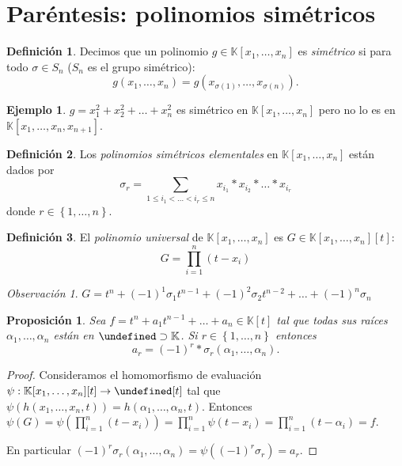 \documentclass[10pt, spanish]{report}
\newtheorem{prop}[tma]{Proposición}
\theoremstyle{definition}
\newtheorem*{defin}{Definición}
\newtheorem*{ej}{Ejemplo}
\theoremstyle{custom}
\theoremstyle{remark}
\newtheorem*{obs}{Observación}
\newcommand{\K}{\mathbb{K}}
\let\L\undefined
\newcommand{\L}{\mathbb{L}}
\renewcommand{\leq}{\leqslant}
\newcommand{\fecha}[1]{\marginpar{\underline{\footnotesize{#1}}}}
\begin{document}
\fecha{12/04}
\section{Paréntesis: polinomios simétricos}
\begin{defin}
    Decimos que un polinomio $g\in\K[x_1,\ldots,x_n]$ es \textit{simétrico} si
    para todo $\sigma\in S_n$ ($S_n$ es el grupo simétrico): 
    \[g(x_1,\ldots,x_n)=g(x_{\sigma(1)},\ldots,x_{\sigma(n)}).\] 
\end{defin}

\begin{ej}
    $g=x_1^2+x_2^2+\ldots+x_n^2$ es simétrico en $\K[x_1,\ldots,x_n]$ pero no lo
    es en $\K[x_1,\ldots,x_n,x_{n+1}]$. 
\end{ej}

\begin{defin}
    Los \textit{polinomios simétricos elementales} en $\K[x_1,\ldots,x_n]$ están
    dados por \[\sigma_r=\sum_{{1\leq i_1 <\ldots<i_r\leq n}}
    x_{i_1}*x_{i_2}*\ldots*x_{i_r}\] donde $r\in\left\{ 1,\ldots,n \right\}$.
\end{defin}

\begin{defin}
    El \textit{polinomio universal} de $\K[x_1,\ldots,x_n]$ es
    $G\in\K[x_1,\ldots,x_n][t]$:
    \[G=\prod_{i=1}^n(t-x_i)\] 
\end{defin}

\begin{obs}
    $G=t^n+(-1)^1\sigma_1t^{n-1}+(-1)^2\sigma_2t^{n-2}+\ldots+(-1)^n\sigma_n$ 
\end{obs}

\begin{prop}\label{prop:coefsigma}
    Sea $f=t^n+a_1t^{n-1}+\ldots+a_n\in\K[t]$ tal que todas sus raíces
    $\alpha_1,\ldots,\alpha_n$ están en $\L\supset \K$. Si $r\in\left\{
    1,\ldots,n \right\}$ entonces
    \[a_r=(-1)^r*\sigma_r(\alpha_1,\ldots,\alpha_n).\]  
\end{prop}
\begin{proof}
    Consideramos el homomorfismo de evaluación $\psi:\K[x_1,\ldots,x_n][t]\to
    \L[t]$ tal que $\psi(h(x_1,\ldots,x_n,t))=h(\alpha_1,\ldots,\alpha_n,t)$.
    Entonces $\psi(G)=\psi\left(\prod_{i=1}^n(t-x_i)\right)=
    \prod_{i=1}^n\psi(t-x_i)=\prod_{i=1}^n(t-\alpha_i)=f$.

    En particular $(-1)^r\sigma_r(\alpha_1,\ldots,\alpha_n)=
    \psi\left( (-1)^r\sigma_r \right) = a_r$. 
\end{proof}
\end{document}
